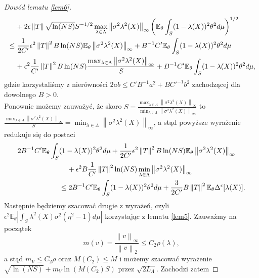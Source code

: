 \documentclass[man,mfiu]{mgrwms}
\newcommand{\norm}[1]{\left\lVert#1\right\rVert}
\begin{document}
\begin{proof}[Dowód lematu \ref{lem6}]
\begin{displaymath}
\begin{split}
&\hspace{4mm}+2\epsilon\norm{T}\sqrt{\ln (NS)}S^{-1/2}\max_{\lambda\in \Lambda}\norm{\sigma^2\lambda^2(X)}_{\infty}\left(\mathbb{E}_{\theta}\int_S(1-\lambda(X))^2\theta ^2d\mu\right)^{1/2}\\
&\leq \frac{1}{2C'}\epsilon^2\norm{T}^2B\ln (NS)\mathbb{E}_{\theta}\norm{\sigma^2\lambda^2(X)}_{\infty}+B^{-1}C'\mathbb{E}_{\theta}\int_S(1-\lambda(X))^2\theta ^2d\mu\\
&\hspace{4mm}+\epsilon^2\frac{1}{C'}\norm{T}^2B\ln (NS)\frac{\max_{\lambda\in \Lambda}\norm{\sigma^2\lambda^2(X)}_{\infty}}{S}+B^{-1}C'\mathbb{E}_{\theta}\int_S(1-\lambda(X))^2\theta ^2d\mu,
\end{split}
\end{displaymath}
gdzie korzystaliśmy z nierówności $2ab\leq C'B^{-1}a^2+BC'^{-1}b^2$ zachodzącej dla dowolnego $B>0$.\\
Ponownie możemy zauważyć, że skoro $S=\frac{\max_{\lambda\in \Lambda}\norm{\sigma^2\lambda^2(X)}_{\infty}}{\min_{\lambda\in \Lambda}\norm{\sigma^2\lambda^2(X)}_{\infty}}$ to $\frac{\max_{\lambda\in \Lambda}\norm{\sigma^2\lambda^2(X)}_{\infty}}{S}=\min_{\lambda\in \Lambda}\norm{\sigma^2\lambda^2(X)}_{\infty}$, a stąd powyższe wyrażenie redukuje się do postaci
\begin{displaymath}
\begin{split}
2B^{-1}C'\mathbb{E}_{\theta}\int_S&(1-\lambda(X))^2\theta ^2d\mu+\frac{1}{2C'}\epsilon^2\norm{T}^2B\ln (NS)\mathbb{E}_{\theta}\norm{\sigma^2\lambda^2(X)}_{\infty}\\
&\hspace{4mm}+\epsilon^2B\frac{1}{C'}\norm{T}^2\ln (NS)\min_{\lambda\in \Lambda}\norm{\sigma^2\lambda^2(X)}_{\infty}\\
&\leq 2B^{-1}C'\mathbb{E}_{\theta}\int_S(1-\lambda(X))^2\theta ^2d\mu+\frac{3}{2C'}B\norm{T}^2\mathbb{E}_{\theta}\Delta^{\epsilon}[\lambda(X)].
\end{split}
\end{displaymath}
Następnie będziemy szacować drugie z  wyrażeń, czyli $\epsilon^2\mathbb{E}_{\theta}\left|\int_S\lambda^2(X)\sigma^2(\eta^2-1)d\mu\right|$ korzystając z lematu \ref{lem5}.  Zauważmy na początek 
\begin{displaymath}
m(v)=\frac{\norm{v}_{\infty}}{\norm{v}_2}\leq C_2\rho (\lambda),
\end{displaymath}
a stąd $m_V\leq C_2\rho$ oraz $M(C_2)\leq M$ i możemy szacować wyrażenie $\sqrt{\ln (NS)}+m_V\ln (M(C_2)S)$ przez $\sqrt{2L_{\Lambda}}$. Zachodzi zatem

\end{proof}
\end{document}
